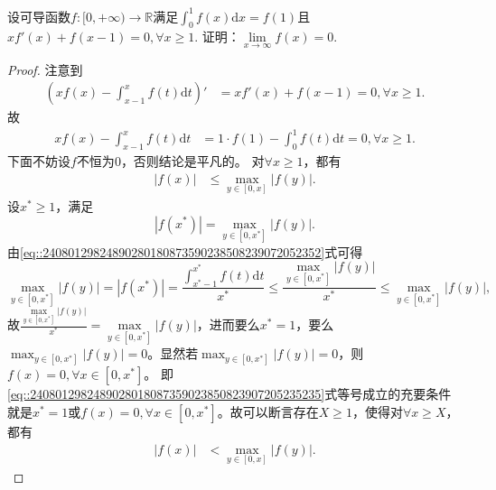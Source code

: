 \documentclass[../../main.tex]{subfiles}
\begin{document}
\begin{example}
设可导函数$f:[0,+\infty)\to\mathbb{R}$满足$\int_0^1 f(x)\mathrm{d}x = f(1)$且 $x f'(x) + f(x - 1) = 0, \forall x \geq 1$. 证明：$\lim\limits_{x\to\infty} f(x) = 0$.
\end{example}
\begin{proof}
注意到
\begin{align*}
\left( xf\left( x \right) -\int_{x-1}^x{f\left( t \right) \mathrm{d}t} \right) ' &= xf'\left( x \right) +f\left( x-1 \right) =0,\forall x\geqslant 1. 
\end{align*}
故
\begin{align}
xf\left( x \right) -\int_{x-1}^x{f\left( t \right) \mathrm{d}t} &= 1\cdot f\left( 1 \right) -\int_0^1{f\left( t \right) \mathrm{d}t}=0,\forall x\geqslant 1. \label{eq::24080129824890280180873590238508239072052352}
\end{align}
下面不妨设$f$不恒为$0$，否则结论是平凡的。
对$\forall x\geqslant 1$，都有
\begin{align}
\left| f\left( x \right) \right| &\leqslant \max_{y\in \left[ 0,x \right]} \left| f\left( y \right) \right|. \label{eq::2408012982489028018087359023850823907205235235}
\end{align}
设$x^*\geqslant 1$，满足
\[
\left| f\left( x^* \right) \right|=\max_{y\in \left[ 0,x^* \right]} \left| f\left( y \right) \right|.
\]
由\eqref{eq::24080129824890280180873590238508239072052352}式可得
\[
\max_{y\in \left[ 0,x^* \right]} \left| f\left( y \right) \right|=\left| f\left( x^* \right) \right|=\frac{\int_{x^*-1}^{x^*}{f\left( t \right) \mathrm{d}t}}{x^*}\leqslant \frac{\max\limits_{y\in \left[ 0,x^* \right]} \left| f\left( y \right) \right|}{x^*}\leqslant \max_{y\in \left[ 0,x^* \right]} \left| f\left( y \right) \right|,
\]
故$\frac{\max\limits_{y\in \left[ 0,x^* \right]} \left| f\left( y \right) \right|}{x^*}=\max\limits_{y\in \left[ 0,x^* \right]} \left| f\left( y \right) \right|$，进而要么$x^*=1$，要么$\max_{y\in \left[ 0,x^* \right]} \left| f\left( y \right) \right|=0$。显然若$\max_{y\in \left[ 0,x^* \right]} \left| f\left( y \right) \right|=0$，则$f\left( x \right) =0,\forall x\in \left[ 0,x^* \right]$。
即\eqref{eq::2408012982489028018087359023850823907205235235}式等号成立的充要条件就是$x^*=1$或$f\left( x \right) =0,\forall x\in \left[ 0,x^* \right]$。故可以断言存在$X\geqslant 1$，使得对$\forall x\geqslant X$，都有
\begin{align}
\left| f\left( x \right) \right| &< \max_{y\in \left[ 0,x \right]} \left| f\left( y \right) \right|. \label{eq::2408012982489028018087359023850823907205235236}

\end{align}
\end{proof}
\end{document}
